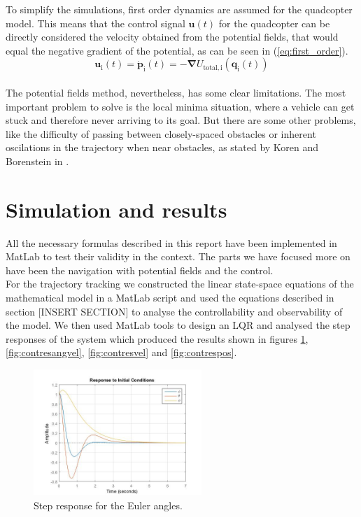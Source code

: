 \documentclass[journal]{IEEEtran}
\newcommand*{\subb}[1]{_{\mathrm{#1}}}
\begin{document}
	To simplify the simulations, first order dynamics are assumed for the quadcopter model. This means that the control signal $\bm{u}(t)$ for the quadcopter can be directly considered the velocity obtained from the potential fields, that would equal the negative gradient of the potential, as can be seen in (\ref{eq:first_order}).
	\begin{equation} \label{eq:first_order}
	\bm{u}\subb{i}(t) = \bm{\dot p}\subb{i}(t) = -\bm{\nabla}U\subb{total, i}(\bm{q}\subb{i}(t))
	\end{equation}
	\\
	The potential fields method, nevertheless, has some clear limitations. The most important problem to solve is the local minima situation, where a vehicle can get stuck and therefore never arriving to its goal. But there are some other problems, like the difficulty of passing between closely-spaced obstacles or inherent oscilations in the trajectory when near obstacles, as stated by Koren and Borenstein in \cite{koren_pot_fields_limitations}. 
	
	\section{Simulation and results}
	All the necessary formulas described in this report have been implemented in MatLab to test their validity in the context. The parts we have focused more on have been the navigation with potential fields and the control.\\
	
	For the trajectory tracking we constructed the linear state-space equations of the mathematical model in a MatLab script and used the equations described in section [INSERT SECTION] to analyse the controllability and observability of the model.  We then used MatLab tools to design an LQR and analysed the step responses of the system which produced the results shown in figures \figurename{\ref{fig:contresangles}}, \figurename{\ref{fig:contresangvel}}, \figurename{\ref{fig:contresvel}} and \figurename{\ref{fig:contrespos}}.  \\


	
		\begin{figure}[H]
  			\centering
  			\includegraphics[width=2.5in]{Results/Controll/Fig1}
  			\caption{Step response for the Euler angles.}
  			\label{fig:contresangles}
		\end{figure}	
		
\end{document}
